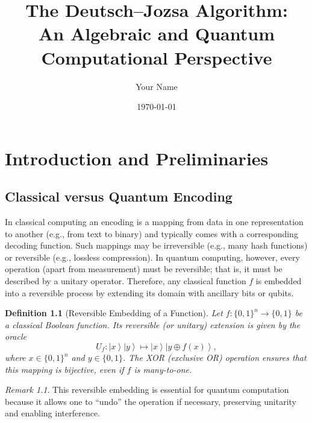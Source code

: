 \documentclass[11pt,oneside]{book}
\newtheorem{definition}{Definition}[chapter]
\theoremstyle{remark}
\newtheorem*{remark}{Remark}
\renewcommand{\ket}[1]{\left|#1\right\rangle}      %
\newcommand{\xor}{\oplus}                        %
\begin{document}
	
	\frontmatter
	\title{The Deutsch--Jozsa Algorithm:\\ 
		An Algebraic and Quantum Computational Perspective}
	\author{Your Name}
	\date{\today}
	\maketitle
	\tableofcontents
	
	\mainmatter
	
	\chapter{Introduction and Preliminaries}
	
	\section{Classical versus Quantum Encoding}
	
	In classical computing an encoding is a mapping from data in one representation to another (e.g., from text to binary) and typically comes with a corresponding decoding function. Such mappings may be irreversible (e.g., many hash functions) or reversible (e.g., lossless compression). In quantum computing, however, every operation (apart from measurement) must be reversible; that is, it must be described by a unitary operator. Therefore, any classical function \( f \) is embedded into a reversible process by extending its domain with ancillary bits or qubits.
	
	\begin{definition}[Reversible Embedding of a Function]
		Let \( f : \{0,1\}^n \to \{0,1\} \) be a classical Boolean function. Its reversible (or unitary) extension is given by the oracle 
		\[
		U_f : \ket{x}\ket{y} \mapsto \ket{x}\ket{y \xor f(x)},
		\]
		where \( x \in \{0,1\}^n \) and \( y \in \{0,1\} \). The XOR (exclusive OR) operation ensures that this mapping is bijective, even if \( f \) is many-to-one.
	\end{definition}
	
	\begin{remark}
		This reversible embedding is essential for quantum computation because it allows one to “undo” the operation if necessary, preserving unitarity and enabling interference.
	\end{remark}
	
\end{document}
